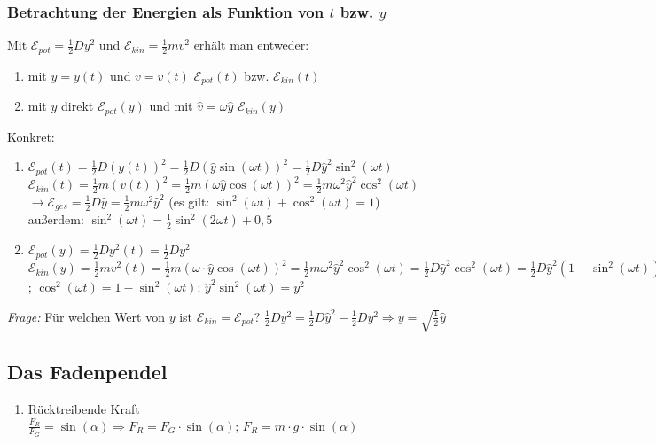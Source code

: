 \documentclass[a4paper]{scrartcl}
\begin{document}
\subsubsection{Betrachtung der Energien als Funktion von \(t\) bzw. \(y\)}
Mit \(\mathcal{E}_{pot} = \frac{1}{2}Dy^2\) und \(\mathcal{E}_{kin} =
\frac{1}{2}mv^2\) erhält man entweder:
\begin{enumerate}
	\item mit \(y=y(t)\) und \(v=v(t)\) \(\mathcal{E}_{pot}(t)\) bzw.
		\(\mathcal{E}_{kin}(t)\)
	\item mit \(y\) direkt \(\mathcal{E}_{pot}(y)\) und  mit \(\hat{v}=\omega
		\hat{y}\) \(\mathcal{E}_{kin}(y)\)
\end{enumerate}
Konkret:
\begin{enumerate}
	\item \(\mathcal{E}_{pot}(t) = \frac{1}{2} D (y(t))^2 = \frac{1}{2} D
		(\hat{y} \sin(\omega t))^2 = \frac{1}{2} D \hat{y}^2 \sin^2(\omega t)\)
		\\
		\(\mathcal{E}_{kin}(t) = \frac{1}{2} m (v(t))^2 = \frac{1}{2} m
		(\omega \hat{y} \cos(\omega t))^2 = \frac{1}{2} m \omega^2 \hat{y}^2
		\cos^2(\omega t)\)
		\(\longrightarrow \mathcal{E}_{ges} = \frac{1}{2} D \hat{y} =
		\frac{1}{2} m \omega^2 \hat{y}^2\) (es gilt: \(\sin^2(\omega t) +
		\cos^2(\omega t) = 1\))
		\\
		außerdem: \(\sin^2(\omega t) = \frac{1}{2} \sin^2 (2 \omega t) + 0,5\)
	\item \(\mathcal{E}_{pot}(y) = \frac{1}{2} D y^2(t) = \frac{1}{2}D y^2\)
		\\
		\( \mathcal{E}_{kin}(y) = \frac{1}{2} m v^2(t) =  \frac{1}{2} m (\omega
		\cdot \hat{y} \cos(\omega t))^2 = \frac{1}{2} m \omega^2 \hat{y}^2
		\cos^2(\omega t) = \frac{1}{2} D \hat{y}^2 \cos^2(\omega t) =
		\frac{1}{2} D \hat{y}^2 ( 1 - \sin^2(\omega t) ) = \frac{1}{2} D
		\hat{y}^2 - \frac{1}{2} D \hat{y}^2 \sin^2(\omega t) = \frac{1}{2} D
		\hat{y}^2 - \frac{1}{2} D y^2 = \mathcal{E}_{ges} -
		\mathcal{E}_{pot} \); \( \cos^2(\omega t) = 1 - \sin^2(\omega t);\,
		\hat{y}^2 \sin^2(\omega t) = y^2 \)
\end{enumerate}
\emph{Frage:} Für welchen Wert von \(y\) ist \( \mathcal{E}_{kin} =
\mathcal{E}_{pot} \)? \( \frac{1}{2}Dy^2 = \frac{1}{2}D\hat{y}^2 - \frac{1}{2}
Dy^2 \Rightarrow y = \sqrt{\frac{1}{2}}\hat{y} \)

\subsection{Das Fadenpendel}
\begin{enumerate}
	\item Rücktreibende Kraft\\
		\( \frac{F_R}{F_G} = \sin(\alpha) \Rightarrow F_R = F_G \cdot
		\sin(\alpha);\, F_R = m \cdot g \cdot \sin(\alpha) \)
\end{enumerate}
\end{document}
